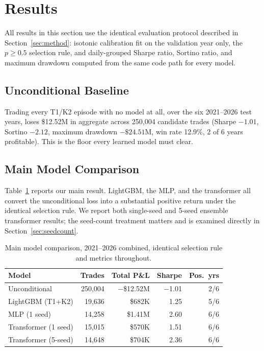 \documentclass[sigconf,review,anonymous]{acmart}
\begin{document}
\section{Results}
\label{sec:results}

All results in this section use the identical evaluation protocol described in Section~\ref{sec:method}: isotonic calibration fit on the validation year only, the $p \ge 0.5$ selection rule, and daily-grouped Sharpe ratio, Sortino ratio, and maximum drawdown computed from the same code path for every model.

\subsection{Unconditional Baseline}
Trading every T1/K2 episode with no model at all, over the six 2021--2026 test years, loses \$12.52M in aggregate across 250{,}004 candidate trades (Sharpe $-1.01$, Sortino $-2.12$, maximum drawdown $-\$24.51$M, win rate 12.9\%, 2 of 6 years profitable). This is the floor every learned model must clear.

\subsection{Main Model Comparison}
Table~\ref{tab:maincomparison} reports our main result. LightGBM, the MLP, and the transformer all convert the unconditional loss into a substantial positive return under the identical selection rule. We report both single-seed and 5-seed ensemble transformer results; the seed-count treatment matters and is examined directly in Section~\ref{sec:seedcount}.

\begin{table}[H]
\centering
\small
\begin{tabular}{lrrrr}
\toprule
Model & Trades & Total P\&L & Sharpe & Pos.\ yrs \\
\midrule
Unconditional & 250{,}004 & $-$\$12.52M & $-$1.01 & 2/6 \\
LightGBM (T1+K2) & 19{,}636 & \$682K & 1.25 & 5/6 \\
MLP (1 seed) & 14{,}258 & \$1.41M & 2.60 & 6/6 \\
Transformer (1 seed) & 15{,}015 & \$570K & 1.51 & 6/6 \\
Transformer (5-seed) & 14{,}648 & \$704K & 2.36 & 6/6 \\
\bottomrule
\end{tabular}
\caption{Main model comparison, 2021--2026 combined, identical selection rule and metrics throughout.}
\label{tab:maincomparison}
\end{table}
\end{document}
